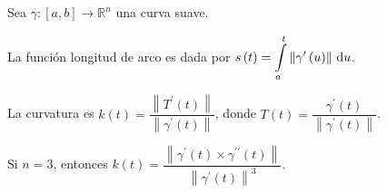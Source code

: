 \begin{frame}
    Sea $\gamma\colon\left[a,b\right]\to\mathbb{R}^{n}$ una curva
    suave.
    \begin{definition}
        La función \alert{longitud de arco} es dada por
        \begin{math}
            \displaystyle
            s\left(t\right)=
            \int\limits_{a}^{t}
            \left\|
            \gamma^{\prime}\left(u\right)
            \right\|\dl u
        \end{math}.
    \end{definition}

    \begin{definition}[Curvatura]
        La \alert{curvatura} es
        \begin{math}
            k\left(t\right)=
            \dfrac{
                \left\|
                T^{\prime}\left(t\right)
                \right\|
            }{
                \left\|
                \gamma^{\prime}\left(t\right)
                \right\|
            }
        \end{math},
        donde
        \begin{math}
            T\left(t\right)=
            \dfrac{
                \gamma^{\prime}\left(t\right)
            }{
                \left\|
                \gamma^{\prime}\left(t\right)
                \right\|
            }
        \end{math}.
    \end{definition}

    \begin{theorem}
        Si $n=3$, entonces
        \begin{math}
            k\left(t\right)=
            \dfrac{
                \left\|
                \gamma^{\prime}\left(t\right)\times
                \gamma^{\prime\prime}\left(t\right)
                \right\|
            }{
                {\left\|
                        \gamma^{\prime}\left(t\right)
                        \right\|}^{3}
            }
        \end{math}.
    \end{theorem}


\end{frame}
